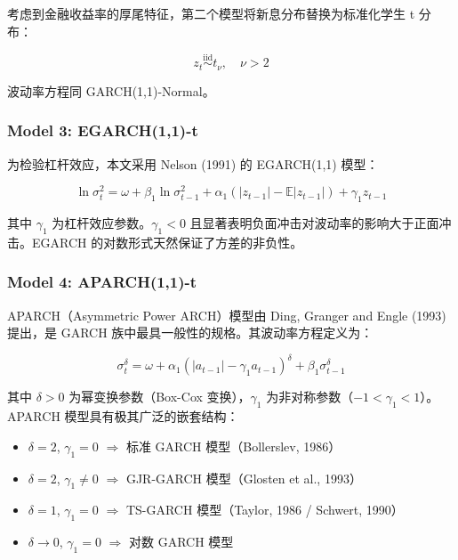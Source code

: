 \documentclass[12pt,a4paper]{article}
\begin{document}
考虑到金融收益率的厚尾特征，第二个模型将新息分布替换为标准化学生 t 分布：

\begin{equation}
z_t \overset{\mathrm{iid}}{\sim} t_{\nu}, \quad \nu > 2 \label{eq:garch_t}
\end{equation}

波动率方程同 GARCH(1,1)-Normal。

\subsubsection{Model 3: EGARCH(1,1)-t}

为检验杠杆效应，本文采用 Nelson (1991) 的 EGARCH(1,1) 模型：

\begin{equation}
\ln\sigma_t^2 = \omega + \beta_1 \ln\sigma_{t-1}^2 + \alpha_1 \left( |z_{t-1}| - \mathbb{E}|z_{t-1}| \right) + \gamma_1 z_{t-1} \label{eq:egarch}
\end{equation}

其中 $\gamma_1$ 为杠杆效应参数。$\gamma_1 < 0$ 且显著表明负面冲击对波动率的影响大于正面冲击。EGARCH 的对数形式天然保证了方差的非负性。

\subsubsection{Model 4: APARCH(1,1)-t}

APARCH（Asymmetric Power ARCH）模型由 Ding, Granger and Engle (1993) 提出，是 GARCH 族中最具一般性的规格。其波动率方程定义为：

\begin{equation}
\sigma_t^{\delta} = \omega + \alpha_1 \left( |a_{t-1}| - \gamma_1 a_{t-1} \right)^{\delta} + \beta_1 \sigma_{t-1}^{\delta} \label{eq:aparch}
\end{equation}

其中 $\delta > 0$ 为幂变换参数（Box-Cox 变换），$\gamma_1$ 为非对称参数（$-1 < \gamma_1 < 1$）。APARCH 模型具有极其广泛的嵌套结构：
\begin{itemize}[nosep]
    \item $\delta = 2$, $\gamma_1 = 0$ $\Rightarrow$ 标准 GARCH 模型（Bollerslev, 1986）
    \item $\delta = 2$, $\gamma_1 \neq 0$ $\Rightarrow$ GJR-GARCH 模型（Glosten et al., 1993）
    \item $\delta = 1$, $\gamma_1 = 0$ $\Rightarrow$ TS-GARCH 模型（Taylor, 1986 / Schwert, 1990）
    \item $\delta \to 0$, $\gamma_1 = 0$ $\Rightarrow$ 对数 GARCH 模型
\end{itemize}
\end{document}
